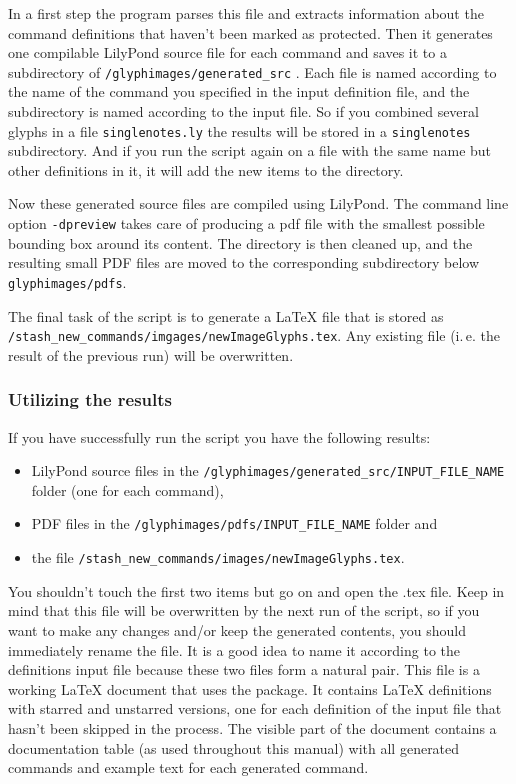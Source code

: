 \documentclass{article}
\begin{document}
In a first step the program parses this file and extracts information about the command definitions that haven't been marked as protected. Then it generates one compilable LilyPond source file for each command and saves it to a subdirectory of \texttt{/glyphimages/generated\_src} .
Each file is named according to the name of the command you specified in the input definition file, and the subdirectory is named according to the input file.
So if you combined several glyphs in a file \texttt{singlenotes.ly} the results will be stored in a \texttt{singlenotes} subdirectory.
And if you run the script again on a file with the same name but other definitions in it, it will add the new items to the directory.

Now these generated source files are compiled using LilyPond. 
The command line option \verb|-dpreview| takes care of producing a pdf file with the smallest possible bounding box around its content.
The directory is then cleaned up, and the resulting small PDF files are moved to the corresponding subdirectory below \texttt{glyphimages/pdfs}.

The final task of the script is to generate a \LaTeX{} file that is stored as \texttt{/stash\_new\_commands/imgages/newImageGlyphs.tex}.
Any existing file (i.\,e. the result of the previous run) will be overwritten.


\subsubsection{Utilizing the results}
\label{subsubsec:BGI_utilizing_results}

If you have successfully run the script you have the following results:
\begin{itemize}
\item LilyPond source files in the \texttt{/glyphimages/generated\_src/INPUT\_FILE\_NAME} folder (one for each command),
\item PDF files in the \texttt{/glyphimages/pdfs/INPUT\_FILE\_NAME} folder and
\item the file \texttt{/stash\_new\_commands/images/newImageGlyphs.tex}.
\end{itemize}
You shouldn't touch the first two items but go on and open the .tex file.
Keep in mind that this file will be overwritten by the next run of the script, so if you want to make any changes and/or keep the generated contents, you should immediately rename the file.
It is a good idea to name it according to the definitions input file because these two files form a natural pair.
This file is a working \LaTeX{} document that uses the \lilyglyphs{} package.
It contains \LaTeX{}  definitions with starred and unstarred versions, one for each definition of the input file that hasn't been skipped in the process.
The visible part of the document contains a documentation table (as used throughout this manual) with all generated commands and example text for each generated command.
\end{document}
